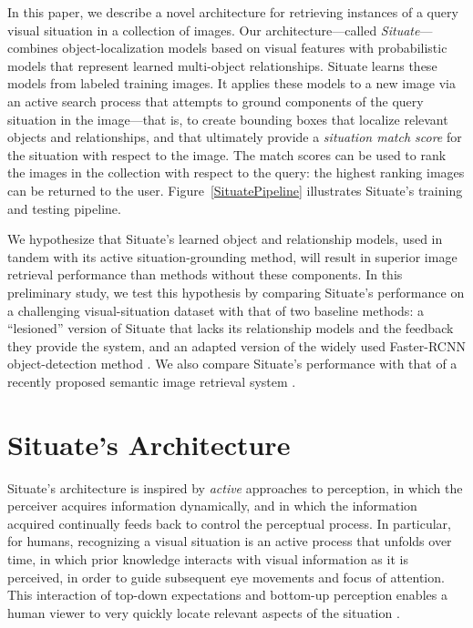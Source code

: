 \documentclass[conference]{IEEEtran}
\begin{document}
In this paper, we describe a novel architecture for retrieving
instances of a query visual situation in a collection of images.  Our
architecture---called {\it Situate}---combines object-localization
models based on visual features with probabilistic models that
represent learned multi-object relationships.  Situate
learns these models from labeled training images.  It applies these
models to a new image via an active search process that attempts to
ground components of the query situation in the image---that is, to
create bounding boxes that localize relevant objects and
relationships, and that ultimately provide a {\it situation match
  score} for the situation with respect to the image. The match scores
can be used to rank the images in the collection with respect to the
query: the highest ranking images can be returned to the user.
Figure~\ref{SituatePipeline} illustrates Situate's training and
testing pipeline.

We hypothesize that Situate's learned object and relationship models, used
in tandem with its active situation-grounding method, will result in
superior image retrieval performance than methods without these
components.  In this preliminary study, we test this hypothesis by
comparing Situate's performance on a challenging visual-situation
dataset with that of two baseline methods: a ``lesioned'' version of
Situate that lacks its relationship models and the feedback they provide
the system, and an adapted version of the widely used Faster-RCNN
object-detection method \cite{Ren2015}.  We also compare Situate's
performance with that of a recently proposed semantic image retrieval system
\cite{Johnson2015a}.

\section{Situate's Architecture \label{SituateArchitecture}}

Situate's architecture is inspired by {\it active} approaches to
perception, in which the perceiver acquires information dynamically,
and in which the information acquired continually feeds back to
control the perceptual process.  In particular, for humans,
recognizing a visual situation is an active process that unfolds over
time, in which prior knowledge interacts with visual information as it
is perceived, in order to guide subsequent eye movements and focus of
attention.  This interaction of top-down expectations and bottom-up
perception enables a human viewer to very quickly locate relevant
aspects of the situation \cite{Neider2006,Summerfield2009}.
\end{document}
